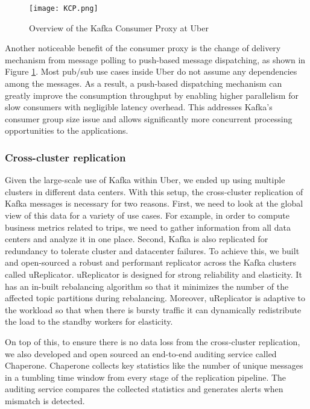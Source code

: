 \documentclass[sigconf]{acmart}
\begin{document}
\begin{figure}[h]
  \centering
  \texttt{[image: KCP.png]}
  \caption{Overview of the Kafka Consumer Proxy at Uber}
  \label{fig:kcp}
\end{figure}

Another noticeable benefit of the consumer proxy is the change of delivery mechanism from message polling to push-based message dispatching, as shown in Figure \ref{fig:kcp}. Most pub/sub use cases inside Uber do not assume any dependencies among the messages. As a result, a push-based dispatching mechanism can greatly improve the consumption throughput by enabling higher parallelism for slow consumers with negligible latency overhead. This addresses Kafka’s consumer group size issue and allows significantly more concurrent processing opportunities to the applications. 

\subsubsection{Cross-cluster replication} \label{sec:kafka-cross-dc}

Given the large-scale use of Kafka within Uber, we ended up using multiple clusters in different data centers. With this setup, the cross-cluster replication of Kafka messages is necessary for two reasons. First, we need to look at the global view of this data for a variety of use cases. For example, in order to compute business metrics related to trips, we need to gather information from all data centers and analyze it in one place. Second, Kafka is also replicated for redundancy to tolerate cluster and datacenter failures. To achieve this, we built and open-sourced a robust and performant replicator across the Kafka clusters called uReplicator\cite{ureplicator}. uReplicator is designed for strong reliability and elasticity. It has an in-built rebalancing algorithm so that it minimizes the number of the affected topic partitions during rebalancing. Moreover, uReplicator is adaptive to the workload so that when there is bursty traffic it can dynamically redistribute the load to the standby workers for elasticity. 

On top of this, to ensure there is no data loss from the cross-cluster replication, we also developed and open sourced an end-to-end auditing service called Chaperone\cite{chaperone}. Chaperone collects key statistics like the number of unique messages in a tumbling time window from every stage of the replication pipeline. The auditing service compares the collected statistics and generates alerts when mismatch is detected.
\end{document}
